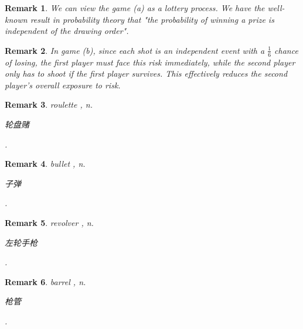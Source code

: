 \documentclass[12pt,letterpaper, onecolumn]{exam}
\newtheorem{remark}{Remark}
\begin{document}
\begin{questions}
\begin{solution}
\end{solution}
\begin{remark}
    We can view the game (a) as a lottery process. We have the well-known result in probability theory that "the probability of winning a prize is independent of the drawing order".
\end{remark}
\begin{remark}
    In game (b), since each shot is an independent event with a $\frac{1}{6}$ chance of losing, the first player must face this risk immediately, while the second player only has to shoot if the first player survives. This effectively reduces the second player’s overall exposure to risk.
\end{remark}
\begin{remark}
    roulette , n. \begin{CJK}{UTF8}{gbsn}轮盘赌\end{CJK}.
\end{remark}
\begin{remark}
    bullet , n. \begin{CJK}{UTF8}{gbsn}子弹\end{CJK}.
\end{remark}
\begin{remark}
    revolver , n. \begin{CJK}{UTF8}{gbsn}左轮手枪\end{CJK}.
\end{remark}
\begin{remark}
    barrel , n. \begin{CJK}{UTF8}{gbsn}枪管\end{CJK}.

\end{remark}
\end{questions}
\end{document}

